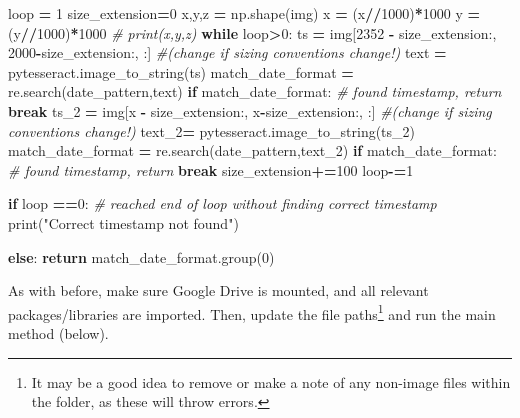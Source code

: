 \documentclass[
]{article}
\newenvironment{Shaded}{\begin{snugshade}}{\end{snugshade}}
\newcommand{\BuiltInTok}[1]{#1}
\newcommand{\CommentTok}[1]{\textcolor[rgb]{0.56,0.35,0.01}{\textit{#1}}}
\newcommand{\ControlFlowTok}[1]{\textcolor[rgb]{0.13,0.29,0.53}{\textbf{#1}}}
\newcommand{\DecValTok}[1]{\textcolor[rgb]{0.00,0.00,0.81}{#1}}
\newcommand{\NormalTok}[1]{#1}
\newcommand{\OperatorTok}[1]{\textcolor[rgb]{0.81,0.36,0.00}{\textbf{#1}}}
\newcommand{\StringTok}[1]{\textcolor[rgb]{0.31,0.60,0.02}{#1}}
\begin{document}
\begin{Shaded}
\begin{Highlighting}[]
\NormalTok{    loop }\OperatorTok{=} \DecValTok{1}
\NormalTok{    size\_extension}\OperatorTok{=}\DecValTok{0}
\NormalTok{    x,y,z }\OperatorTok{=}\NormalTok{ np.shape(img)}
\NormalTok{    x }\OperatorTok{=}\NormalTok{ (x}\OperatorTok{//}\DecValTok{1000}\NormalTok{)}\OperatorTok{*}\DecValTok{1000}
\NormalTok{    y }\OperatorTok{=}\NormalTok{ (y}\OperatorTok{//}\DecValTok{1000}\NormalTok{)}\OperatorTok{*}\DecValTok{1000}
    \CommentTok{\# print(x,y,z)}
    \ControlFlowTok{while}\NormalTok{ loop}\OperatorTok{\textgreater{}}\DecValTok{0}\NormalTok{:}
\NormalTok{      ts }\OperatorTok{=}\NormalTok{ img[}\DecValTok{2352} \OperatorTok{{-}}\NormalTok{ size\_extension:, }\DecValTok{2000}\OperatorTok{{-}}\NormalTok{size\_extension:, :] }\CommentTok{\#(change if sizing conventions change!)}
\NormalTok{      text }\OperatorTok{=}\NormalTok{ pytesseract.image\_to\_string(ts)}
\NormalTok{      match\_date\_format }\OperatorTok{=}\NormalTok{ re.search(date\_pattern,text)}
      \ControlFlowTok{if}\NormalTok{ match\_date\_format:}
        \CommentTok{\# found timestamp, return}
        \ControlFlowTok{break}
\NormalTok{      ts\_2 }\OperatorTok{=}\NormalTok{ img[x }\OperatorTok{{-}}\NormalTok{ size\_extension:, x}\OperatorTok{{-}}\NormalTok{size\_extension:, :] }\CommentTok{\#(change if sizing conventions change!)}
\NormalTok{      text\_2}\OperatorTok{=}\NormalTok{ pytesseract.image\_to\_string(ts\_2)}
\NormalTok{      match\_date\_format }\OperatorTok{=}\NormalTok{ re.search(date\_pattern,text\_2)}
      \ControlFlowTok{if}\NormalTok{ match\_date\_format:}
        \CommentTok{\# found timestamp, return}
        \ControlFlowTok{break}
\NormalTok{      size\_extension}\OperatorTok{+=}\DecValTok{100}
\NormalTok{      loop}\OperatorTok{{-}=}\DecValTok{1}

    \ControlFlowTok{if}\NormalTok{ loop }\OperatorTok{==}\DecValTok{0}\NormalTok{:      }
      \CommentTok{\# reached end of loop without finding correct timestamp}
      \BuiltInTok{print}\NormalTok{(}\StringTok{"Correct timestamp not found"}\NormalTok{)}

    \ControlFlowTok{else}\NormalTok{:}
      \ControlFlowTok{return}\NormalTok{ match\_date\_format.group(}\DecValTok{0}\NormalTok{)}
\end{Highlighting}
\end{Shaded}

As with before, make sure Google Drive is mounted, and all relevant packages/libraries are imported. Then, update the file paths\footnote{It may be a good idea to remove or make a note of any non-image files within the folder, as these will throw errors.} and run the main method (below).
\end{document}
